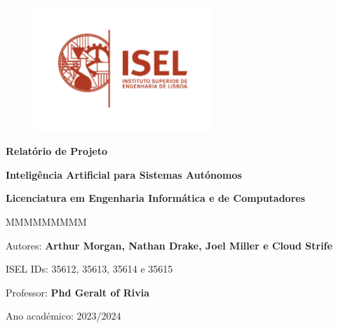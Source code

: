 \begin{figure}
    \centering
    \includegraphics[width=0.6\textwidth]{../figures/logo-isel}
    \label{fig:isel-logo}
\end{figure}

\begin{center}

    \vspace*{2cm} %

    \textbf{\Huge{}Relatório de Projeto}

    \vspace{1cm}

    \textbf{\LARGE{}Inteligência Artificial para Sistemas Autónomos}

    \textbf{\large{}Licenciatura em Engenharia Informática e de Computadores}{\huge\par}


    \vfill{} %

    \begin{lyxlist}{MMMMMMMMM}
        \begin{singlespace}
            \item [{Autores:}] \textbf{Arthur Morgan, Nathan Drake, Joel Miller e Cloud Strife }
            \item [{ISEL IDs:}]  35612, 35613, 35614 e 35615
            \item [{Professor:}] \textbf{Phd Geralt of Rivia}
            \item [{Ano académico:}] 2023/2024
        \end{singlespace}
    \end{lyxlist}
\end{center}
